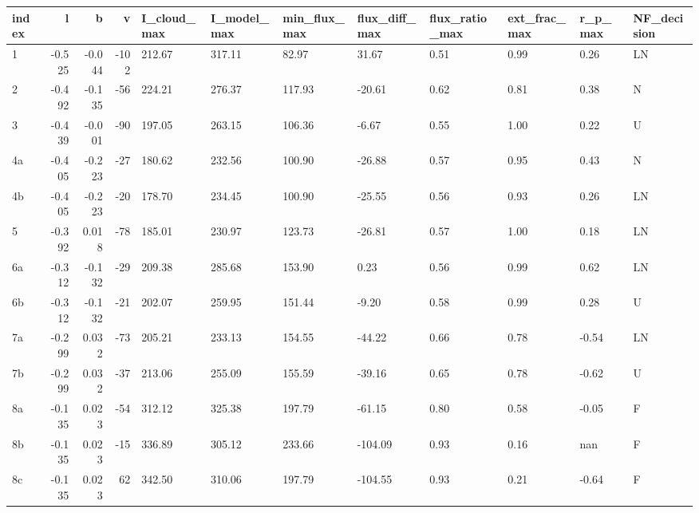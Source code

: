 \begin{tabular}{lrrrllllllll}
\toprule
index &      l &      b &    v & I\_cloud\_max & I\_model\_max & min\_flux\_max & flux\_diff\_max & flux\_ratio\_max & ext\_frac\_max & r\_p\_max & NF\_decision \\
\midrule
    1 & -0.525 & -0.044 & -102 &      212.67 &      317.11 &        82.97 &         31.67 &           0.51 &         0.99 &    0.26 &          LN \\
    2 & -0.492 & -0.135 &  -56 &      224.21 &      276.37 &       117.93 &        -20.61 &           0.62 &         0.81 &    0.38 &           N \\
    3 & -0.439 & -0.001 &  -90 &      197.05 &      263.15 &       106.36 &         -6.67 &           0.55 &         1.00 &    0.22 &           U \\
   4a & -0.405 & -0.223 &  -27 &      180.62 &      232.56 &       100.90 &        -26.88 &           0.57 &         0.95 &    0.43 &           N \\
   4b & -0.405 & -0.223 &  -20 &      178.70 &      234.45 &       100.90 &        -25.55 &           0.56 &         0.93 &    0.26 &          LN \\
    5 & -0.392 &  0.018 &  -78 &      185.01 &      230.97 &       123.73 &        -26.81 &           0.57 &         1.00 &    0.18 &          LN \\
   6a & -0.312 & -0.132 &  -29 &      209.38 &      285.68 &       153.90 &          0.23 &           0.56 &         0.99 &    0.62 &          LN \\
   6b & -0.312 & -0.132 &  -21 &      202.07 &      259.95 &       151.44 &         -9.20 &           0.58 &         0.99 &    0.28 &           U \\
   7a & -0.299 &  0.032 &  -73 &      205.21 &      233.13 &       154.55 &        -44.22 &           0.66 &         0.78 &   -0.54 &          LN \\
   7b & -0.299 &  0.032 &  -37 &      213.06 &      255.09 &       155.59 &        -39.16 &           0.65 &         0.78 &   -0.62 &           U \\
   8a & -0.135 &  0.023 &  -54 &      312.12 &      325.38 &       197.79 &        -61.15 &           0.80 &         0.58 &   -0.05 &           F \\
   8b & -0.135 &  0.023 &  -15 &      336.89 &      305.12 &       233.66 &       -104.09 &           0.93 &         0.16 &     nan &           F \\
   8c & -0.135 &  0.023 &   62 &      342.50 &      310.06 &       197.79 &       -104.55 &           0.93 &         0.21 &   -0.64 &           F \\

\end{tabular}
